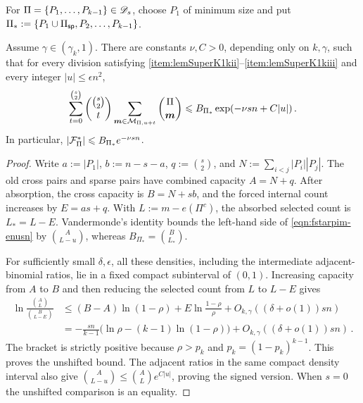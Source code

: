 For $\Pi=\{P_1,\dots,P_{k-1}\}\in{\mathscr D}_s$, choose $P_1$ of minimum size and put $\Pi_\ast:=\{P_1\cup\Pi_{\mathsf{sp}},P_2,\dots,P_{k-1}\}$.

\begin{lemma}\label{lemma:super-Fstar}
Assume $\gamma\in(\gamma_k,1)$. There are constants $\nu,C>0$, depending only on $k,\gamma$, such that for every division satisfying  \ref{item:lemSuperK1kii}--\ref{item:lemSuperK1kiii} and every integer $|u|\leq\epsilon n^2$,
\begin{equation}\label{eqn:fstarpim-enusn}
\sum_{t=0}^{\binom s2}\binom{\binom s2}{t}\sum_{\boldsymbol{m}\in{\mathcal M}_{\Pi,u+t}}\binom{\Pi}{\boldsymbol{m}}\leqslant B_{\Pi_\ast}\exp(-\nu sn+C|u|)\,.
\end{equation}
In particular, $|{\mathcal F}^\ast_\Pi|\leqslant B_{\Pi_\ast}e^{-\nu sn}$.
\end{lemma}
\begin{proof}
Write $a:=|P_1|$, $b:=n-s-a$, $q:=\binom s2$, and $N:=\sum_{i<j}|P_i||P_j|$. The old cross pairs and sparse pairs have combined capacity $A=N+q$. After absorption, the cross capacity is $B=N+sb$, and the forced internal count increases by $E=as+q$. With $L:=m-e(\Pi^c)$, the absorbed selected count is $L_\ast=L-E$. Vandermonde's identity bounds the left-hand side of \eqref{eqn:fstarpim-enusn} by $\binom A{L-u}$, whereas $B_{\Pi_\ast}=\binom B{L_\ast}$.

For sufficiently small $\delta,\epsilon$, all these densities, including the intermediate adjacent-binomial ratios, lie in a fixed compact subinterval of $(0,1)$. Increasing capacity from $A$ to $B$ and then reducing the selected count from $L$ to $L-E$ gives
\begin{align*}
\ln\frac{\binom AL}{\binom B{L-E}}&\leq(B-A)\ln(1-\rho)+E\ln\frac{1-\rho}{\rho}+O_{k,\gamma}((\delta+o(1))sn)\\
&=-\frac{sn}{k-1}\bigl(\ln\rho-(k-1)\ln(1-\rho)\bigr)+O_{k,\gamma}((\delta+o(1))sn)\,.
\end{align*}
The bracket is strictly positive because $\rho>p_k$ and $p_k=(1-p_k)^{k-1}$. This proves the unshifted bound. The adjacent ratios in the same compact density interval also give $\binom A{L-u}\leq\binom AL e^{C|u|}$, proving the signed version. When $s=0$ the unshifted comparison is an equality.
\end{proof}

